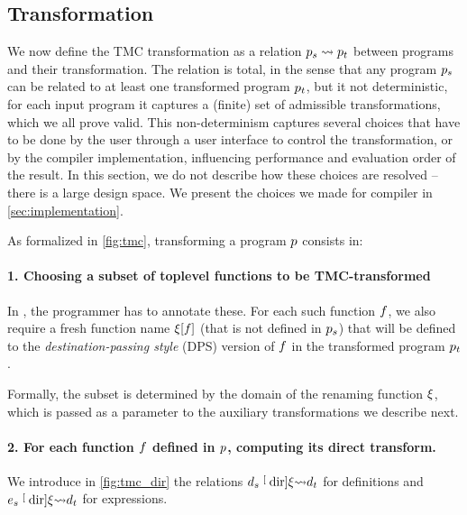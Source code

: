 \subsection{Transformation}
\label{subsec:transformation}

We now define the TMC transformation as a relation $\datalangProg_s \tmc \datalangProg_t$ between programs and their transformation. The relation is total, in the sense that any \DataLang program $\datalangProg_s$ can be related to at least one transformed program $\datalangProg_t$, but it not deterministic, for each input program it captures a (finite) set of admissible transformations, which we all prove valid. This non-determinism captures several choices that have to be done by the user through a user interface to control the transformation, or by the compiler implementation, influencing performance and evaluation order of the result. In this section, we do not describe how these choices are resolved -- there is a large design space. We present the choices we made for \OCaml compiler in \cref{sec:implementation}.

As formalized in \cref{fig:tmc}, transforming a \DataLang program $\datalangProg$ consists in:


\paragraph{1. Choosing a subset of toplevel functions to be TMC-transformed}
In \OCaml, the programmer has to annotate these.
For each such function $\datalangFn$, we also require a fresh function name $\datalangRenaming [\datalangFn]$ (that is not defined in $\datalangProg_s$) that will be defined to the \emph{destination-passing style} (DPS) version of $\datalangFn$ in the transformed program $\datalangProg_t$.

Formally, the subset is determined by the domain of the renaming function $\xi$, which is passed as a parameter to the auxiliary transformations we describe next.


\paragraph{2. For each function $\datalangFn$ defined in $\datalangProg$, computing its direct transform.}
We introduce in \cref{fig:tmc_dir} the relations $\datalangDef_s \tmcDir{\datalangRenaming} \datalangDef_t$ for definitions and $\datalangExpr_s \tmcDir{\datalangRenaming} \datalangDef_t$ for expressions.

